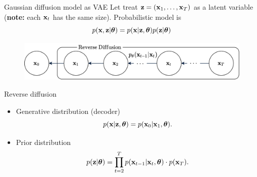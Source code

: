 \begin{frame}{Gaussian diffusion model as VAE}
	Let treat $\mathbf{z} = (\mathbf{x}_1, \dots, \mathbf{x}_T)$ as a latent variable (\textbf{note:} each $\mathbf{x}_t$ has the same size). Probabilistic model is
		\[
			p(\mathbf{x}, \mathbf{z} | \boldsymbol{\theta}) = p(\mathbf{x} | \mathbf{z}, \boldsymbol{\theta}) p(\mathbf{z} | \boldsymbol{\theta})
		\]	
		\vspace{-0.4cm}
	\begin{figure}
		\includegraphics[width=0.8\linewidth]{figs/diffusion_pgm_reverse}
	\end{figure}
	\begin{block}{Reverse diffusion}

	\begin{itemize}
		\item Generative distribution (decoder)
		\vspace{-0.3cm}
		\[
			p(\mathbf{x} | \mathbf{z}, \boldsymbol{\theta}) = p(\mathbf{x}_0 | \mathbf{x}_1, \boldsymbol{\theta}).
		\]
		\item Prior distribution
		\vspace{-0.3cm}
		\[
			p(\mathbf{z} | \boldsymbol{\theta}) = \prod_{t=2}^T p(\mathbf{x}_{t - 1} | \mathbf{x}_t, \boldsymbol{\theta})  \cdot p(\mathbf{x}_T).
		\]
	\end{itemize}
	\end{block}
\end{frame}

